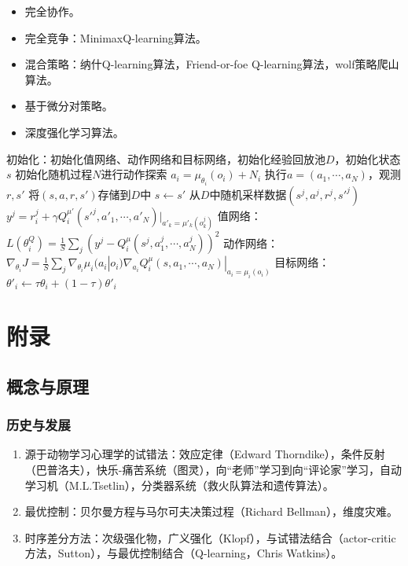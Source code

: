 \documentclass[
12pt, %
a4paper, 
oneside, %
headinclude,footinclude, %
]{scrartcl}
\begin{document}
\begin{itemize}
\item 完全协作。
\item 完全竞争：MinimaxQ-learning算法。
\item 混合策略：纳什Q-learning算法，Friend-or-foe Q-learning算法，wolf策略爬山算法。
\item 基于微分对策略。
\item 深度强化学习算法。
\end{itemize}
\begin{myalgorithm}[MADDPG]
\State 初始化：初始化值网络、动作网络和目标网络，初始化经验回放池$ D $，初始化状态$ s $
\State 初始化随机过程$ N $进行动作探索
\State $ a_i = \mu_{\theta_i}(o_i) + N_i $ 
\State 执行$ a = (a_1, \cdots, a_N) $，观测$ r, s' $
\State 将$ (s, a, r, s')$存储到$ D $中
\State $ s \leftarrow s'$
\State 从$ D $中随机采样数据$ (s^j, a^j, r^j, s'^j) $
\State $ y^j = r_i^j + \gamma Q_i^{\mu'}(s'^j, a'_1, \cdots, a'_N)|_{a'_k = \mu'_k(o_k^j)} $ 
\State 值网络：$ L(\theta_i^Q) = \frac{1}{S}\sum_j(y^j - Q_i^{\mu}(s^j, a_1^j, \cdots, a_N^j))^2 $ 
\State 动作网络：$ \nabla_{\theta_i}J = \frac{1}{S}\sum_j \nabla_{\theta_i}\mu_i(a_i|o_i)\nabla_{a_i}Q_i^{\mu}(s, a_1, \cdots, a_N)|_{a_i = \mu_i(o_i)}$ 
\State 目标网络：$ \theta'_i \leftarrow \tau \theta_i + (1 - \tau)\theta'_i $
\EndFor
\EndFor
\EndFor
\end{myalgorithm}
\section{附录}
\subsection[概念与原理]{概念与原理}
\subsubsection[历史与发展]{历史与发展}\label{sec:history}
\begin{enumerate}
\item 源于动物学习心理学的试错法：效应定律（Edward Thorndike），条件反射（巴普洛夫），快乐-痛苦系统（图灵），向“老师”学习到向“评论家”学习，自动学习机（M.L.Tsetlin），分类器系统（救火队算法和遗传算法）。
\item 最优控制：贝尔曼方程与马尔可夫决策过程（Richard Bellman），维度灾难。
\item 时序差分方法：次级强化物，广义强化（Klopf），与试错法结合（actor-critic方法，Sutton），与最优控制结合（Q-learning，Chris Watkins）。
\end{enumerate}
\end{document}
